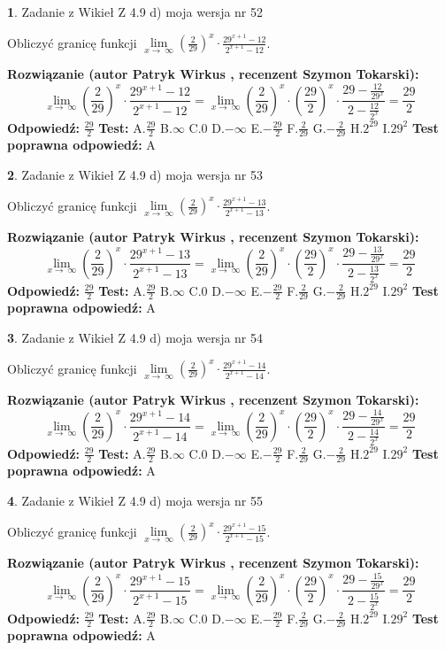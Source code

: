 \documentclass[12pt, a4paper]{article}
\theoremstyle{definition} %
\newtheorem{zad}{}
\newcommand{\zadStart}[1]{\begin{zad}#1\newline}
\newcommand{\zadStop}{\end{zad}}
\newcommand{\rozwStart}[2]{\noindent \textbf{Rozwiązanie (autor #1 , recenzent #2): }\newline}
\newcommand{\rozwStop}{\newline}
\newcommand{\odpStart}{\noindent \textbf{Odpowiedź:}\newline}
\newcommand{\odpStop}{\newline}
\newcommand{\testStart}{\noindent \textbf{Test:}\newline}
\newcommand{\testStop}{\newline}
\newcommand{\kluczStart}{\noindent \textbf{Test poprawna odpowiedź:}\newline}
\newcommand{\kluczStop}{\newline}
\begin{document}
\zadStart{Zadanie z Wikieł Z 4.9 d) moja wersja nr 52}


Obliczyć granicę funkcji  $\lim\limits_{x\to\ \infty}(\frac{2}{29})^{x}\cdot\frac{29^{x+1}-12}{2^{x+1}-12}$.
\zadStop
\rozwStart{Patryk Wirkus}{Szymon Tokarski}
$$\lim\limits_{x\to\ \infty}(\frac{2}{29})^{x}\cdot\frac{29^{x+1}-12}{2^{x+1}-12}=\lim\limits_{x\to\ \infty}(\frac{2}{29})^{x}\cdot(\frac{29}{2})^{x} \cdot \frac{29-\frac{12}{29^{x}}}{2-\frac{12}{2^{x}}} = \frac{29}{2}$$
\rozwStop
\odpStart
$\frac{29}{2}$
\odpStop
\testStart
A.$\frac{29}{2}$ B.$\infty$ C.$0$ D.$-\infty$ E.$-\frac{29}{2}$
F.$\frac{2}{29}$ G.$-\frac{2}{29}$
H.$2^{29}$
I.$29^{2}$
\testStop
\kluczStart
A
\kluczStop



\zadStart{Zadanie z Wikieł Z 4.9 d) moja wersja nr 53}


Obliczyć granicę funkcji  $\lim\limits_{x\to\ \infty}(\frac{2}{29})^{x}\cdot\frac{29^{x+1}-13}{2^{x+1}-13}$.
\zadStop
\rozwStart{Patryk Wirkus}{Szymon Tokarski}
$$\lim\limits_{x\to\ \infty}(\frac{2}{29})^{x}\cdot\frac{29^{x+1}-13}{2^{x+1}-13}=\lim\limits_{x\to\ \infty}(\frac{2}{29})^{x}\cdot(\frac{29}{2})^{x} \cdot \frac{29-\frac{13}{29^{x}}}{2-\frac{13}{2^{x}}} = \frac{29}{2}$$
\rozwStop
\odpStart
$\frac{29}{2}$
\odpStop
\testStart
A.$\frac{29}{2}$ B.$\infty$ C.$0$ D.$-\infty$ E.$-\frac{29}{2}$
F.$\frac{2}{29}$ G.$-\frac{2}{29}$
H.$2^{29}$
I.$29^{2}$
\testStop
\kluczStart
A
\kluczStop



\zadStart{Zadanie z Wikieł Z 4.9 d) moja wersja nr 54}


Obliczyć granicę funkcji  $\lim\limits_{x\to\ \infty}(\frac{2}{29})^{x}\cdot\frac{29^{x+1}-14}{2^{x+1}-14}$.
\zadStop
\rozwStart{Patryk Wirkus}{Szymon Tokarski}
$$\lim\limits_{x\to\ \infty}(\frac{2}{29})^{x}\cdot\frac{29^{x+1}-14}{2^{x+1}-14}=\lim\limits_{x\to\ \infty}(\frac{2}{29})^{x}\cdot(\frac{29}{2})^{x} \cdot \frac{29-\frac{14}{29^{x}}}{2-\frac{14}{2^{x}}} = \frac{29}{2}$$
\rozwStop
\odpStart
$\frac{29}{2}$
\odpStop
\testStart
A.$\frac{29}{2}$ B.$\infty$ C.$0$ D.$-\infty$ E.$-\frac{29}{2}$
F.$\frac{2}{29}$ G.$-\frac{2}{29}$
H.$2^{29}$
I.$29^{2}$
\testStop
\kluczStart
A
\kluczStop



\zadStart{Zadanie z Wikieł Z 4.9 d) moja wersja nr 55}


Obliczyć granicę funkcji  $\lim\limits_{x\to\ \infty}(\frac{2}{29})^{x}\cdot\frac{29^{x+1}-15}{2^{x+1}-15}$.
\zadStop
\rozwStart{Patryk Wirkus}{Szymon Tokarski}
$$\lim\limits_{x\to\ \infty}(\frac{2}{29})^{x}\cdot\frac{29^{x+1}-15}{2^{x+1}-15}=\lim\limits_{x\to\ \infty}(\frac{2}{29})^{x}\cdot(\frac{29}{2})^{x} \cdot \frac{29-\frac{15}{29^{x}}}{2-\frac{15}{2^{x}}} = \frac{29}{2}$$
\rozwStop
\odpStart
$\frac{29}{2}$
\odpStop
\testStart
A.$\frac{29}{2}$ B.$\infty$ C.$0$ D.$-\infty$ E.$-\frac{29}{2}$
F.$\frac{2}{29}$ G.$-\frac{2}{29}$
H.$2^{29}$
I.$29^{2}$
\testStop
\kluczStart
A
\kluczStop
\end{document}
